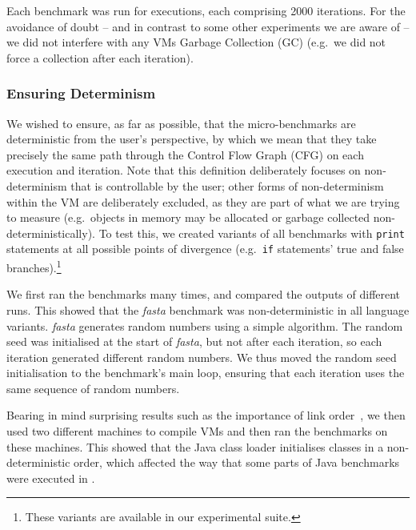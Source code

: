 \documentclass[10pt,preprint]{sigplanconf}
\newcommand{\fasta}{\emph{fasta}\xspace}
\begin{document}
Each benchmark was run for  executions, each comprising 2000
iterations. For the avoidance of doubt -- and in
contrast to some other experiments we are aware of  -- we 
did not interfere with any VMs Garbage Collection (GC) (e.g.~we did not
force a collection after each iteration).


\subsubsection{Ensuring Determinism}

We wished to ensure, as far as possible, that the micro-benchmarks are
deterministic from the user's perspective, by which we mean that they
take precisely the same path through the Control Flow Graph (CFG) on each
execution and iteration. Note that this definition deliberately focuses
on non-determinism that is controllable by the user; other forms of
non-determinism within the VM are deliberately excluded, as they are
part of what we are trying to measure (e.g.~objects in memory may be allocated
or garbage collected non-deterministically). To test this, we created variants
of all benchmarks with \texttt{print} statements at all possible points of
divergence (e.g.~\texttt{if} statements' true and false branches).\footnote{These
variants are available in our experimental suite.}

We first ran the benchmarks many  times, and compared the outputs
of different runs. This showed that the \fasta benchmark was non-deterministic
in all language variants. \fasta generates random numbers using a simple
algorithm. The random seed was initialised at the start of \fasta, but not after
each iteration, so each iteration generated different random numbers. We thus
moved the random seed initialisation to the benchmark's main loop, ensuring that
each iteration uses the same sequence of random numbers.

Bearing in mind surprising
results such as the importance of link order~\cite{mytkowicz09surprising}, we
then used two different machines to compile VMs and then ran the benchmarks
on these machines.  This showed that the Java class loader
initialises classes in a non-deterministic order, which affected the way that
some parts of Java benchmarks were executed in  .
\end{document}
